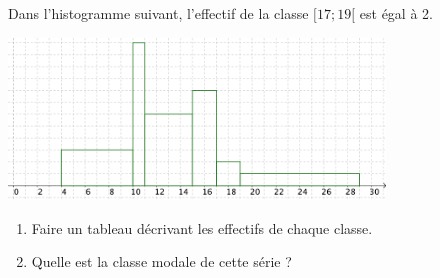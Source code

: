 
\begin{exercice}\label{exoSeconde-0035}

Dans l'histogramme suivant, l'effectif de la classe $[17;19[$ est égal à 2.

\begin{center}
  \includegraphics[width=10cm]{DS8_Fig_Ex1}
\end{center}

\begin{enumerate}
\item Faire un tableau décrivant les effectifs de chaque classe. 
\item Quelle est la classe modale de cette série ?
\end{enumerate}


\end{exercice}
